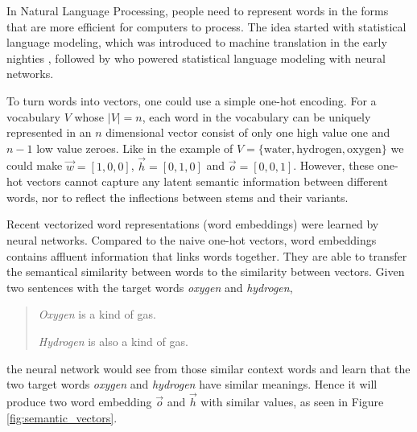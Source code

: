 \documentclass[thesis,fonts=libertine]{cluu}
\begin{document}
In Natural Language Processing, people need to represent words in the forms that are more efficient for computers to process. The idea started with statistical language modeling, which was introduced to machine translation in the early nighties \parencite{brown-etal-1990-statistical}, followed by \textcite{bengio2003neural} who powered statistical language modeling with neural networks.

To turn words into vectors, one could use a simple one-hot encoding. For a vocabulary $V$ whose $|V|=n$, each word in the vocabulary can be uniquely represented in an $n$ dimensional vector consist of only one high value one and $n-1$ low value zeroes. Like in the example of $V=\{\text{water}, \text{hydrogen},  \text{oxygen}\}$ we could make $\vec{w}=[1, 0, 0]$, $\vec{h}=[0, 1, 0]$ and $\vec{o}=[0, 0, 1]$. However, these one-hot vectors cannot capture any latent semantic information between different words, nor to reflect the inflections between stems and their variants.

Recent vectorized word representations (word embeddings) were learned by neural networks. Compared to the naive one-hot vectors, word embeddings contains affluent information that links words together. They are able to transfer the semantical similarity between words to the similarity between vectors. Given two sentences with the target words \textit{oxygen} and \textit{hydrogen},

\begin{quotation}
  \textit{Oxygen} is a kind of gas.
  
  \textit{Hydrogen} is also a kind of gas.
\end{quotation}

\noindent the neural network would see from those similar context words and learn that the two target words \textit{oxygen} and \textit{hydrogen} have similar meanings. Hence it will produce two word embedding $\vec{o}$ and $\vec{h}$ with similar values, as seen in Figure \ref{fig:semantic_vectors}.
\end{document}
